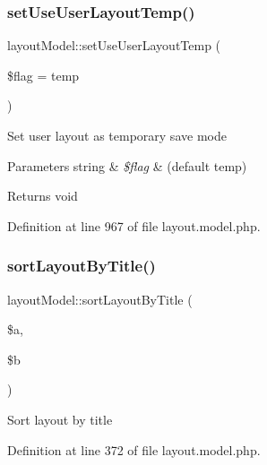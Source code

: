 \mbox{\label{classlayoutModel_a513d5dde919e55e29c25889729d087a1}} 
\subsubsection{\texorpdfstring{set\+Use\+User\+Layout\+Temp()}{setUseUserLayoutTemp()}}
{\footnotesize\ttfamily layout\+Model\+::set\+Use\+User\+Layout\+Temp (\begin{DoxyParamCaption}\item[{}]{\$flag = {\ttfamily \textquotesingle{}temp\textquotesingle{}} }\end{DoxyParamCaption})}

Set user layout as temporary save mode 
\begin{DoxyParams}[1]{Parameters}
string & {\em \$flag} & (default \textquotesingle{}temp\textquotesingle{}) \\
\hline
\end{DoxyParams}
\begin{DoxyReturn}{Returns}
void 
\end{DoxyReturn}


Definition at line 967 of file layout.\+model.\+php.

\mbox{\label{classlayoutModel_a2fe5cbdc4be434f56cc1fed03588d1f4}} 
\subsubsection{\texorpdfstring{sort\+Layout\+By\+Title()}{sortLayoutByTitle()}}
{\footnotesize\ttfamily layout\+Model\+::sort\+Layout\+By\+Title (\begin{DoxyParamCaption}\item[{}]{\$a,  }\item[{}]{\$b }\end{DoxyParamCaption})}

Sort layout by title 

Definition at line 372 of file layout.\+model.\+php.

\mbox{\label{classlayoutModel_a85dfbba773c086806d4d8c9586d16e52}} 
